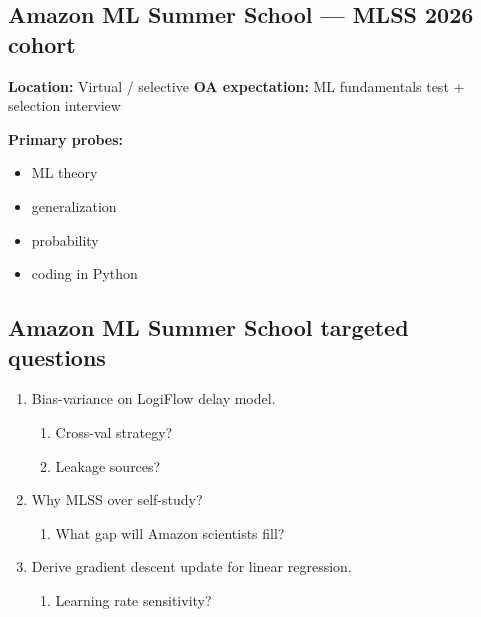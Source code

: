 \documentclass[9pt,a4paper]{article}
\begin{document}
\subsection{Amazon ML Summer School --- MLSS 2026 cohort}
\textbf{Location:} Virtual / selective \quad \textbf{OA expectation:} ML fundamentals test + selection interview

\textbf{Primary probes:}
\begin{itemize}
  \item ML theory
  \item generalization
  \item probability
  \item coding in Python
\end{itemize}

\subsection{Amazon ML Summer School targeted questions}
\begin{enumerate}[label=\textbf{Q\arabic*:}, leftmargin=*]
  \item Bias-variance on LogiFlow delay model.
  \begin{enumerate}[label=\textit{FU\arabic*:}, leftmargin=2em]
    \item Cross-val strategy?
    \item Leakage sources?
  \end{enumerate}
  \item Why MLSS over self-study?
  \begin{enumerate}[label=\textit{FU\arabic*:}, leftmargin=2em]
    \item What gap will Amazon scientists fill?
  \end{enumerate}
  \item Derive gradient descent update for linear regression.
  \begin{enumerate}[label=\textit{FU\arabic*:}, leftmargin=2em]
    \item Learning rate sensitivity?
  \end{enumerate}
\end{enumerate}
\end{document}
